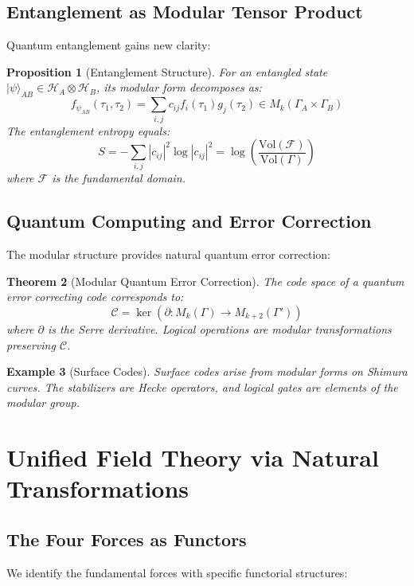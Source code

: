 \documentclass[12pt,a4paper]{article}
\newtheorem{theorem}{Theorem}[section]
\newtheorem{proposition}[theorem]{Proposition}
\newtheorem{example}[theorem]{Example}
\begin{document}
\subsection{Entanglement as Modular Tensor Product}

Quantum entanglement gains new clarity:

\begin{proposition}[Entanglement Structure]
For an entangled state $|\psi\rangle_{AB} \in \mathcal{H}_A \otimes \mathcal{H}_B$, its modular form decomposes as:
\[
f_{\psi_{AB}}(\tau_1, \tau_2) = \sum_{i,j} c_{ij} f_i(\tau_1) g_j(\tau_2) \in M_k(\Gamma_A \times \Gamma_B)
\]
The entanglement entropy equals:
\[
S = -\sum_{i,j} |c_{ij}|^2 \log |c_{ij}|^2 = \log \left(\frac{\text{Vol}(\mathcal{F})}{\text{Vol}(\Gamma)}\right)
\]
where $\mathcal{F}$ is the fundamental domain.
\end{proposition}

\subsection{Quantum Computing and Error Correction}

The modular structure provides natural quantum error correction:

\begin{theorem}[Modular Quantum Error Correction]
The code space of a quantum error correcting code corresponds to:
\[
\mathcal{C} = \ker(\partial: M_k(\Gamma) \to M_{k+2}(\Gamma'))
\]
where $\partial$ is the Serre derivative. Logical operations are modular transformations preserving $\mathcal{C}$.
\end{theorem}

\begin{example}[Surface Codes]
Surface codes arise from modular forms on Shimura curves. The stabilizers are Hecke operators, and logical gates are elements of the modular group.
\end{example}

\section{Unified Field Theory via Natural Transformations}

\subsection{The Four Forces as Functors}

We identify the fundamental forces with specific functorial structures:
\end{document}
